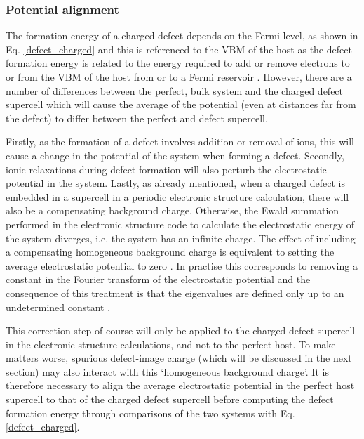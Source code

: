\documentclass[11pt, twoside]{report}
\begin{document}
\subsubsection{Potential alignment}
The formation energy of a charged defect depends on the Fermi level, as shown in Eq. \ref{defect_charged} and this is referenced to the VBM of the host as the defect formation energy is related to the energy required to add or remove electrons to or from the VBM of the host from or to a Fermi reservoir \cite{Alex_defects}.
However, there are a number of differences between the perfect, bulk system and the charged defect supercell which will cause the average of the potential (even at distances far from the defect) to differ between the perfect and defect supercell.

Firstly, as the formation of a defect involves addition or removal of ions, this will cause a change in the potential of the system when forming a defect. Secondly, ionic relaxations during defect formation will also perturb the electrostatic potential in the system. Lastly, as already mentioned, when a charged defect is embedded in a supercell in a periodic electronic structure calculation, there will also be a compensating background charge. Otherwise, the Ewald summation performed in the electronic structure code to calculate the electrostatic energy of the system diverges, i.e. the system has an infinite charge. The effect of including a compensating homogeneous background charge is equivalent to setting the average electrostatic potential to zero \cite{freysoldt_rev}. 
In practise this corresponds to removing a constant in the Fourier transform of the electrostatic potential and the consequence of this treatment is that the eigenvalues are defined only up to an undetermined constant \cite{kumagai_oba, kumagai_oba_9}.

This correction step of course will only be applied to the charged defect supercell in the electronic structure calculations, and not to the perfect host. To make matters worse, spurious defect-image charge (which will be discussed in the next section) may also interact with this `homogeneous background charge'.
It is therefore necessary to align the average electrostatic potential in the perfect host supercell to that of the charged defect supercell before computing the defect formation energy through comparisons of the two systems with Eq. \ref{defect_charged}.
 
\end{document}
